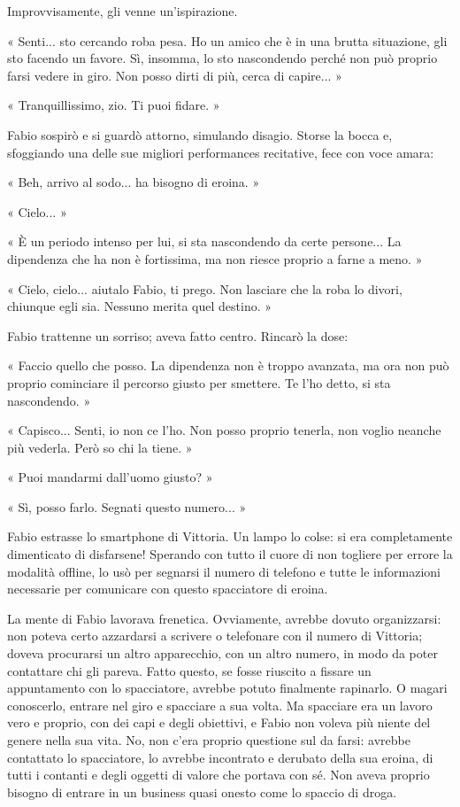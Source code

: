 Improvvisamente, gli venne un'ispirazione.

« Senti... sto cercando roba pesa. Ho un amico che è in una brutta situazione, gli sto facendo un favore. Sì, insomma, lo sto nascondendo perché non può proprio farsi vedere in giro. Non posso dirti di più, cerca di capire... »

« Tranquillissimo, zio. Ti puoi fidare. »

Fabio sospirò e si guardò attorno, simulando disagio. Storse la bocca e, sfoggiando una delle sue migliori performances recitative, fece con voce amara:

« Beh, arrivo al sodo... ha bisogno di eroina. »

« Cielo... »

« È un periodo intenso per lui, si sta nascondendo da certe persone... La dipendenza che ha non è fortissima, ma non riesce proprio a farne a meno. »

« Cielo, cielo... aiutalo Fabio, ti prego. Non lasciare che la roba lo divori, chiunque egli sia. Nessuno merita quel destino. »

Fabio trattenne un sorriso; aveva fatto centro. Rincarò la dose:

« Faccio quello che posso. La dipendenza non è troppo avanzata, ma ora non può proprio cominciare il percorso giusto per smettere. Te l'ho detto, si sta nascondendo. »

« Capisco... Senti, io non ce l'ho. Non posso proprio tenerla, non voglio neanche più vederla. Però so chi la tiene. »

« Puoi mandarmi dall'uomo giusto? »

« Sì, posso farlo. Segnati questo numero... »

Fabio estrasse lo smartphone di Vittoria. Un lampo lo colse: si era completamente dimenticato di disfarsene! Sperando con tutto il cuore di non togliere per errore la modalità offline, lo usò per segnarsi il numero di telefono e tutte le informazioni necessarie per comunicare con questo spacciatore di eroina.

La mente di Fabio lavorava frenetica. Ovviamente, avrebbe dovuto organizzarsi: non poteva certo azzardarsi a scrivere o telefonare con il numero di Vittoria; doveva procurarsi un altro apparecchio, con un altro numero, in modo da poter contattare chi gli pareva. Fatto questo, se fosse riuscito a fissare un appuntamento con lo spacciatore, avrebbe potuto finalmente rapinarlo. O magari conoscerlo, entrare nel giro e spacciare a sua volta. Ma spacciare era un lavoro vero e proprio, con dei capi e degli obiettivi, e Fabio non voleva più niente del genere nella sua vita. No, non c'era proprio questione sul da farsi: avrebbe contattato lo spacciatore, lo avrebbe incontrato e derubato della sua eroina, di tutti i contanti e degli oggetti di valore che portava con sé. Non aveva proprio bisogno di entrare in un business quasi onesto come lo spaccio di droga.

